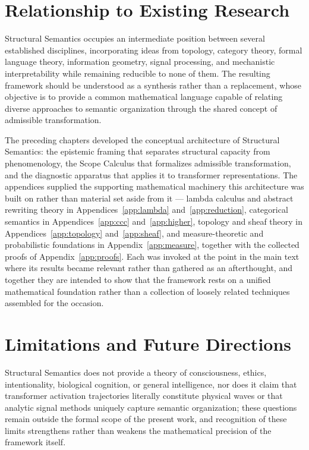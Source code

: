 \documentclass[11pt,twoside,openright]{book}
\numberwithin{equation}{chapter}
\theoremstyle{definition}
\theoremstyle{plain}
\theoremstyle{remark}
\theoremstyle{definition}
\begin{document}
\section{Relationship to Existing Research}

Structural Semantics occupies an intermediate position between several
established disciplines, incorporating ideas from topology, category
theory, formal language theory, information geometry, signal processing,
and mechanistic interpretability while remaining reducible to none of
them. The resulting framework should be understood as a synthesis rather
than a replacement, whose objective is to provide a common mathematical
language capable of relating diverse approaches to semantic organization
through the shared concept of admissible transformation.

The preceding chapters developed the conceptual architecture of
Structural Semantics: the epistemic framing that separates structural
capacity from phenomenology, the Scope Calculus that formalizes
admissible transformation, and the diagnostic apparatus that applies it
to transformer representations. The appendices supplied the supporting
mathematical machinery this architecture was built on rather than
material set aside from it --- lambda calculus and abstract rewriting
theory in Appendices~\ref{app:lambda} and~\ref{app:reduction}, categorical
semantics in Appendices~\ref{app:ccc} and~\ref{app:higher}, topology and
sheaf theory in Appendices~\ref{app:topology} and~\ref{app:sheaf}, and
measure-theoretic and probabilistic foundations in
Appendix~\ref{app:measure}, together with the collected proofs of
Appendix~\ref{app:proofs}. Each was invoked at the point in the main text
where its results became relevant rather than gathered as an
afterthought, and together they are intended to show that the framework
rests on a unified mathematical foundation rather than a collection of
loosely related techniques assembled for the occasion.

\section{Limitations and Future Directions}

Structural Semantics does not provide a theory of consciousness, ethics,
intentionality, biological cognition, or general intelligence, nor does
it claim that transformer activation trajectories literally constitute
physical waves or that analytic signal methods uniquely capture semantic
organization; these questions remain outside the formal scope of the
present work, and recognition of these limits strengthens rather than
weakens the mathematical precision of the framework itself.
\end{document}
